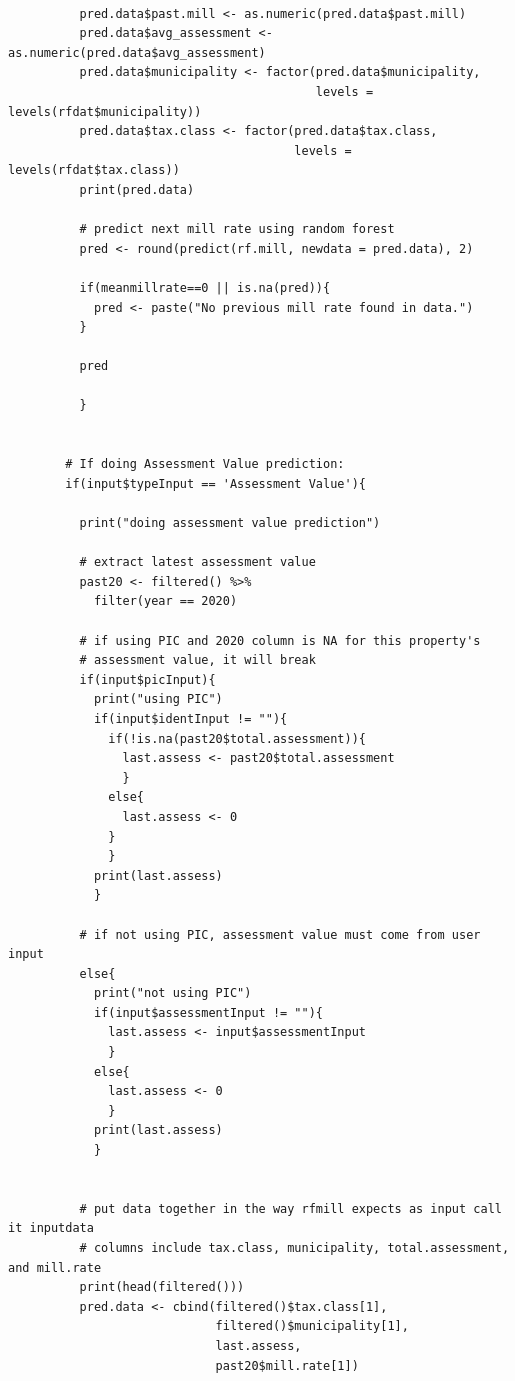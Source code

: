 \documentclass{article}
\begin{document}
\begin{lstlisting}[style=R, caption={Code used for the Shiny app.}, captionpos=b]
        
          pred.data$past.mill <- as.numeric(pred.data$past.mill)
          pred.data$avg_assessment <- as.numeric(pred.data$avg_assessment)
          pred.data$municipality <- factor(pred.data$municipality,
                                           levels = levels(rfdat$municipality))
          pred.data$tax.class <- factor(pred.data$tax.class, 
                                        levels = levels(rfdat$tax.class))
          print(pred.data)
        
          # predict next mill rate using random forest
          pred <- round(predict(rf.mill, newdata = pred.data), 2)
        
          if(meanmillrate==0 || is.na(pred)){
            pred <- paste("No previous mill rate found in data.")
          }
          
          pred
          
          }
          
        
        # If doing Assessment Value prediction:
        if(input$typeInput == 'Assessment Value'){
        
          print("doing assessment value prediction")
        
          # extract latest assessment value
          past20 <- filtered() %>% 
            filter(year == 2020)
           
          # if using PIC and 2020 column is NA for this property's
          # assessment value, it will break 
          if(input$picInput){
            print("using PIC")
            if(input$identInput != ""){
              if(!is.na(past20$total.assessment)){
                last.assess <- past20$total.assessment
                }
              else{
                last.assess <- 0
              }
              }
            print(last.assess)
            }
        
          # if not using PIC, assessment value must come from user input
          else{
            print("not using PIC")
            if(input$assessmentInput != ""){
              last.assess <- input$assessmentInput
              }
            else{
              last.assess <- 0
              }
            print(last.assess)
            }
        
        
          # put data together in the way rfmill expects as input call it inputdata
          # columns include tax.class, municipality, total.assessment, and mill.rate
          print(head(filtered()))
          pred.data <- cbind(filtered()$tax.class[1], 
                             filtered()$municipality[1],
                             last.assess,
                             past20$mill.rate[1])
          

\end{lstlisting}
\end{document}
